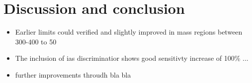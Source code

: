\chapter{Discussion and conclusion}
\label{sec:Discussion}

\begin{itemize}
\item Earlier limits could verified and slightly improved in mass regions between 300-400 to 50\gev
\item The inclusion of ias discriminatior shows good sensitivty increase of 100\% ...
\item further improvements throudh bla bla
\end{itemize}
